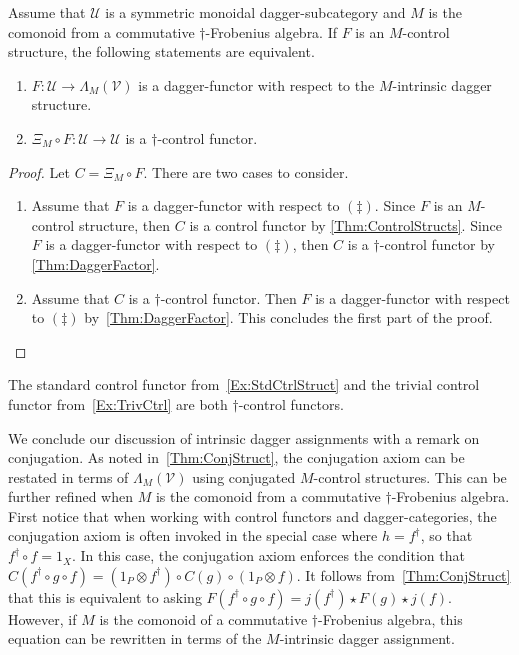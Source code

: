 \begin{cor}
    \label{Cor:ConjControl}
    Assume that $\mathcal{U}$ is a symmetric monoidal dagger-subcategory and $M$ is the comonoid from a commutative $\dagger$-Frobenius algebra.
    If $F$ is an $M$-control structure, the following statements are equivalent.
    \begin{enumerate}
    \item $F: \mathcal{U} \to \Lambda_M( \mathcal{V} )$ is a dagger-functor with respect to the $M$-intrinsic dagger structure.
    \item $\Xi_M \circ F: \mathcal{U} \to \mathcal{U}$ is a $\dagger$-control functor.
    \end{enumerate}
\end{cor}

\begin{proof}
    Let $C = \Xi_M \circ F$.
    There are two cases to consider.
    \begin{enumerate}[align=left]
    \item[$\Rightarrow$]
          Assume that $F$ is a dagger-functor with respect to $( \ddagger )$.
          Since $F$ is an $M$-control structure, then $C$ is a control functor by \cref{Thm:ControlStructs}.
          Since $F$ is a dagger-functor with respect to $( \ddagger )$, then $C$ is a $\dagger$-control functor by \cref{Thm:DaggerFactor}.
    \item[$\Leftarrow$]
          Assume that $C$ is a $\dagger$-control functor.
          Then $F$ is a dagger-functor with respect to $( \ddagger )$ by~\cref{Thm:DaggerFactor}.
          This concludes the first part of the proof.
          \endproof
    \end{enumerate}
\end{proof}

\begin{exa}
    The standard control functor from~\cref{Ex:StdCtrlStruct} and the trivial control functor from~\cref{Ex:TrivCtrl} are both $\dagger$-control functors.
\end{exa}

We conclude our discussion of intrinsic dagger assignments with a remark on conjugation.
As noted in~\cref{Thm:ConjStruct}, the conjugation axiom can be restated in terms of $\Lambda_M( \mathcal{V} )$ using conjugated $M$-control structures.
This can be further refined when $M$ is the comonoid from a commutative $\dagger$-Frobenius algebra.
First notice that when working with control functors and dagger-categories, the conjugation axiom is often invoked in the special case where $h = f^\dagger$, so that $f^\dagger \circ f = 1_X$.
In this case, the conjugation axiom enforces the condition that $C( f^\dagger \circ g \circ f ) = ( 1_P \otimes f^\dagger ) \circ C( g ) \circ ( 1_P \otimes f )$.
It follows from~\cref{Thm:ConjStruct} that this is equivalent to asking $F( f^\dagger \circ g \circ f ) = j( f^\dagger ) \star F( g ) \star j( f )$.
However, if $M$ is the comonoid of a commutative $\dagger$-Frobenius algebra, this equation can be rewritten in terms of the $M$-intrinsic dagger assignment.

